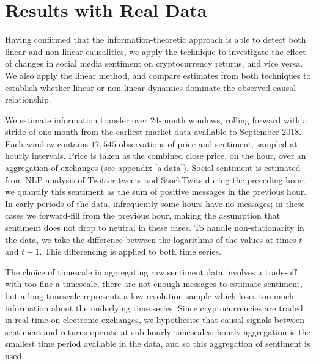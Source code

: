 \documentclass[]{rsos}%
\begin{document}
{\section{Results with Real Data} \label{s.results}
  Having confirmed that the information-theoretic approach is able to detect both linear and non-linear causalities, we apply the technique to investigate the effect of changes in social media sentiment on cryptocurrency returns, and vice versa. We also apply the linear method, and compare estimates from both techniques to establish whether linear or non-linear dynamics dominate the observed causal relationship.

  We estimate information transfer over 24-month windows, rolling forward with a stride of one month from the earliest market data available to September 2018. Each window contains $17,545$ observations of price and sentiment, sampled at hourly intervals. Price is taken as the combined close price, on the hour, over an aggregation of exchanges (see appendix \ref{a.data}). Social sentiment is estimated from NLP analysis of Twitter tweets and StockTwits during the preceding hour; we quantify this sentiment as the sum of positive messages in the previous hour. In early periods of the data, infrequently some hours have no messages; in these cases we forward-fill from the previous hour, making the assumption that sentiment does not drop to neutral in these cases. To handle non-stationarity in the data, we take the difference between the logarithms of the values at times $t$ and $t-1$. This differencing is applied to both time series. 

  The choice of timescale in aggregating raw sentiment data involves a trade-off: with too fine a timescale, there are not enough messages to estimate sentiment, but a long timescale represents a low-resolution sample which loses too much information about the underlying time series. Since cryptocurrencies are traded in real time on electronic exchanges, we hypothesise that causal signals between sentiment and returns operate at sub-hourly timescales; hourly aggregation is the smallest time period available in the data, and so this aggregation of sentiment is used. 

}
\end{document}
